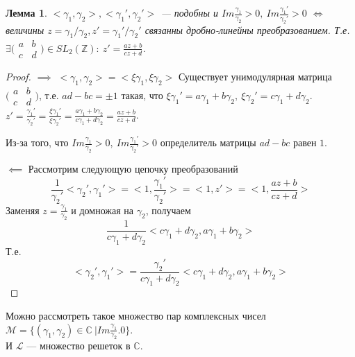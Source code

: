 \documentclass[11pt]{article}
\newtheorem{lemma}{Лемма}
\newcommand{\Z}{\mathbb{Z}}
\begin{document}
\begin{lemma}
    $<\gamma_1, \gamma_2>, <\gamma_1', \gamma_2'>$ --- подобны и $Im \frac{\gamma_1}{\gamma_2} > 0,\ Im \frac{\gamma_1'}{\gamma_2'} > 0$ $\iff$ величины $z = \gamma_1/\gamma_2, z' = \gamma_1'/\gamma_2'$ связанны дробно-линейны преобразованием.
    Т.е. $\exists \big(\begin{smallmatrix}
      a & b\\
      c & d
    \end{smallmatrix}\big) \in SL_2(\Z):\ z' = \frac{az+b}{cz+d}$.
\end{lemma}
\begin{proof}
    $\implies$ $<\gamma_1, \gamma_2> = <\xi \gamma_1, \xi \gamma_2>$
    Существует унимодулярная матрица $\big(\begin{smallmatrix}
      a & b\\
      c & d
    \end{smallmatrix}\big)$, т.е. $ad-bc = \pm1$ такая, что
    $\xi \gamma_1' = a\gamma_1+b\gamma_2,\ \xi \gamma_2' = c\gamma_1+d\gamma_2$.
    $z' = \frac{\gamma_1'}{\gamma_2'} = \frac{\xi\gamma_1'}{\xi\gamma_2'} = \frac{a\gamma_1+b\gamma_2}{c\gamma_1+d\gamma_2} = \frac{az+b}{cz+d}$.

    Из-за того, что $Im \frac{\gamma_1}{\gamma_2} > 0,\ Im \frac{\gamma_1'}{\gamma_2'} > 0$ определитель матрицы $ad-bc$ равен $1$.

    $\impliedby$
    Рассмотрим следующую цепочку преобразований
    \begin{equation*}
        \frac{1}{\gamma_2'} <\gamma_2', \gamma_1'> = <1, \frac{\gamma_1'}{\gamma_2'}> =<1, z'> = <1, \frac{az+b}{cz+d}>
    \end{equation*}
    Заменяя $z = \frac{\gamma_1}{\gamma_2}$ и домножая на $\gamma_2$, получаем
    \begin{equation*}
        \frac{1}{c\gamma_1 +d\gamma_2} <c\gamma_1+d\gamma_2, a\gamma_1+b\gamma_2>
    \end{equation*}
    Т.е.
    \begin{equation*}
        <\gamma_2', \gamma_1'> = \frac{\gamma_2'}{c\gamma_1 +d\gamma_2} <c\gamma_1+d\gamma_2, a\gamma_1+b\gamma_2>
    \end{equation*}
\end{proof}

Можно рассмотреть такое множество пар комплексных чисел $\mathcal{M} = \{(\gamma_1, \gamma_2) \in \mathbb{C}\ | Im \frac{\gamma_1}{\gamma_2} . 0\}$. \\
И $\mathcal{L}$ --- множество решеток в $\mathbb{C}$.
\end{document}
